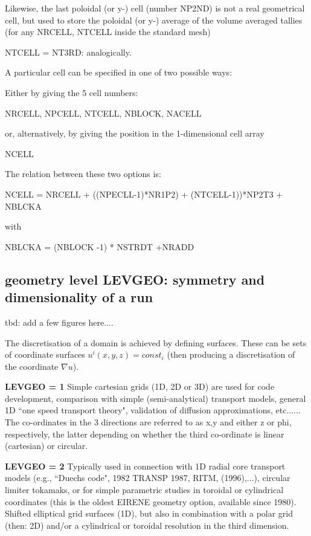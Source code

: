 Likewise, the last poloidal (or y-) cell (number NP2ND) is not a
real geometrical cell, but used to store
the poloidal (or y-) average of the volume averaged tallies (for any
NRCELL, NTCELL inside the standard mesh)

NTCELL = NT3RD: analogically.

\medskip

A particular cell can be specified in one of two possible ways:

Either by giving the 5 cell numbers:

NRCELL, NPCELL, NTCELL, NBLOCK, NACELL

or, alternatively, by giving the position in the 1-dimensional cell array

NCELL

\medskip
The relation between these two options is:

NCELL = NRCELL + ((NPECLL-1)*NR1P2) + (NTCELL-1))*NP2T3 + NBLCKA

with

NBLCKA = (NBLOCK -1) * NSTRDT +NRADD

\subsection{geometry level LEVGEO: symmetry and dimensionality of a run}
\label{sec2.2.2}

tbd: add a few figures here....



The discretisation of a domain is achieved by defining surfaces.
These can be sets of coordinate surfaces $u^i(x,y,z) = const_i$
(then producing a discretisation of the coordinate $\nabla u$).


{\bf LEVGEO = 1}
Simple cartesian grids (1D, 2D or 3D) are used for code development, comparison with simple (semi-analytical) transport models,
general 1D  ``one speed transport theory",
validation of diffusion approximations, etc......  The co-ordinates in the 3 directions are referred to as x,y and either z or phi, respectively,
the latter depending on whether the third co-ordinate is linear (cartesian) or circular.

{\bf LEVGEO = 2} Typically used in connection with 1D radial core
transport models (e.g., ``Duechs code", 1982 TRANSP 1987, RITM,
(1996),...), circular limiter tokamaks, or for simple parametric
studies in toroidal or cylindrical coordinates (this is the oldest
EIRENE geometry option, available since 1980). Shifted elliptical grid surfaces (1D),
but also in combination with a polar grid (then: 2D) and/or a cylindrical or toroidal
resolution in the third dimension.

